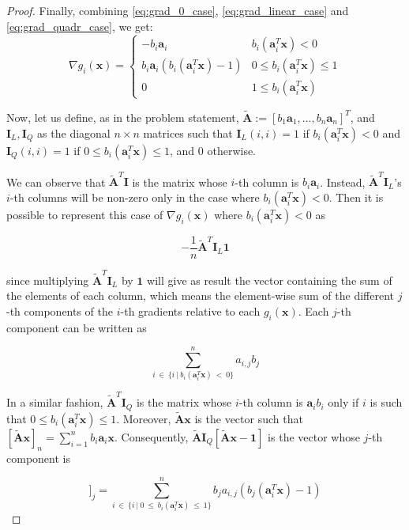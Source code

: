 \documentclass[12pt]{article}
\newcommand{\xb}{\mathbf{x}}
\newcommand{\ab}{\mathbf{a}}
\newcommand{\abi}{\ab_i}
\newcommand{\sumin}{\sum_{i = 1}^n}
\newcommand{\ax}{\abi^T\xb}
\newcommand{\atilde}{\mathbf{\tilde{A}}}
\newcommand{\id}{\mathbf{I}}
\newcommand{\ones}{\mathbf{1}}
\newcommand{\fracn}{\frac{1}{n}}
\newcommand{\linearpred}{b_i(\ax) < 0}
\newcommand{\quadrpred}{0 \leq b_i(\ax) \leq 1}
\begin{document}
\begin{proof}
Finally, combining \eqref{eq:grad_0_case}, \eqref{eq:grad_linear_case} and \eqref{eq:grad_quadr_case}, we get:
\begin{equation}
    \nabla g_i(\xb) = \begin{cases}
            -b_i\abi                & \linearpred \\
            b_i\abi(b_i(\ax) - 1)   & \quadrpred \\
            0                       & 1 \le b_i(\ax)
    \end{cases}
\end{equation}

Now, let us define, as in the problem statement, $\atilde:=[b_1\ab_1, ..., b_n\ab_n]^T$, and $\id_L, \id_Q$ as the diagonal $n \times n$ matrices such that $\id_L(i,i) = 1$ if $\linearpred$ and $\id_Q(i,i) = 1$ if $\quadrpred$, and $0$ otherwise.

We can observe that $\atilde^T\id$ is the matrix whose $i$-th column is $b_i\abi$. Instead, $\atilde^T\id_L$'s $i$-th columns will be non-zero only in the case where $\linearpred$. Then it is possible to represent this case of $\nabla g_i(\xb)$ where $\linearpred$ as

\begin{equation} \label{eq:grad_matrix_linear_case}
    -\fracn\atilde^T\id_L\ones
\end{equation}

since multiplying $\atilde^T\id_L$ by $\ones$ will give as result the vector containing the sum of the elements of each column, which means the element-wise sum of the different $j$-th components of the $i$-th gradients relative to each $g_i(\xb)$. Each $j$-th component can be written as

\begin{equation*}
    \sum_{i \ \in \ \{i \ | \ b_i(\ax) \ < \ 0\}}^{n} a_{i,j} b_j
\end{equation*}

In a similar fashion, $\atilde^T\id_Q$ is the matrix whose $i$-th column is $\abi b_i$ only if $i$ is such that $\quadrpred$. Moreover, $\atilde \xb$ is the vector such that $[\atilde \xb]_n = \sumin b_i\abi\xb$. Consequently, $\atilde\id_Q[\atilde \xb - \ones]$ is the vector whose $j$-th component is

\begin{equation*}
    [\atilde^T\id_Q[\atilde \xb - \ones]]_j =
    \sum_{i \ \in \ \{i \ | \ 0 \ \leq \ b_i(\ax) \ \leq \ 1\}}^{n} b_j a_{i, j} (b_j(\ax) - 1)
\end{equation*}


\end{proof}
\end{document}
